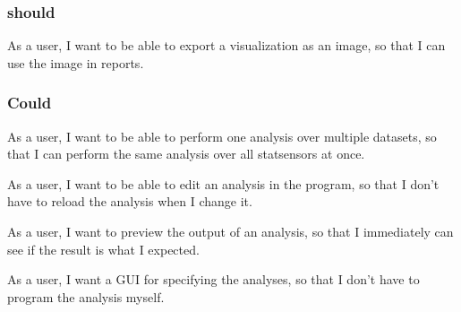 \subsubsection{should}
As a user, I want to be able to export a visualization as an image, so that I can use the image in reports.

\subsubsection{Could}
As a user, I want to be able to perform one analysis over multiple datasets, so that I can perform the same analysis over all statsensors at once.

As a user, I want to be able to edit an analysis in the program, so that I don't have to reload the analysis when I change it.

As a user, I want to preview the output of an analysis, so that I immediately can see if the result is what I expected.

As a user, I want a GUI for specifying the analyses, so that I don't have to program the analysis myself.

